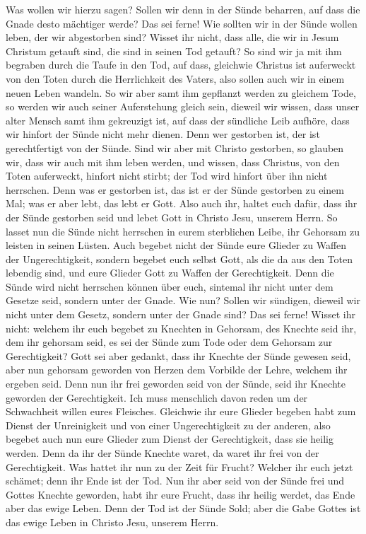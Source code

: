  Was wollen wir hierzu sagen? Sollen wir denn in der Sünde
beharren, auf dass die Gnade desto mächtiger werde?  Das
sei ferne! Wie sollten wir in der Sünde wollen leben, der wir
abgestorben sind?  Wisset ihr nicht, dass alle, die wir in
Jesum Christum getauft sind, die sind in seinen Tod getauft?
 So sind wir ja mit ihm begraben durch die Taufe in den
Tod, auf dass, gleichwie Christus ist auferweckt von den Toten durch die
Herrlichkeit des Vaters, also sollen auch wir in einem neuen Leben
wandeln.  So wir aber samt ihm gepflanzt werden zu
gleichem Tode, so werden wir auch seiner Auferstehung gleich sein,
 dieweil wir wissen, dass unser alter Mensch samt ihm
gekreuzigt ist, auf dass der sündliche Leib aufhöre, dass wir hinfort
der Sünde nicht mehr dienen.  Denn wer gestorben ist, der
ist gerechtfertigt von der Sünde.  Sind wir aber mit
Christo gestorben, so glauben wir, dass wir auch mit ihm leben werden,
 und wissen, dass Christus, von den Toten auferweckt,
hinfort nicht stirbt; der Tod wird hinfort über ihn nicht herrschen.
 Denn was er gestorben ist, das ist er der Sünde
gestorben zu einem Mal; was er aber lebt, das lebt er Gott.
 Also auch ihr, haltet euch dafür, dass ihr der Sünde
gestorben seid und lebet Gott in Christo Jesu, unserem Herrn.
 So lasset nun die Sünde nicht herrschen in eurem
sterblichen Leibe, ihr Gehorsam zu leisten in seinen Lüsten.
 Auch begebet nicht der Sünde eure Glieder zu Waffen der
Ungerechtigkeit, sondern begebet euch selbst Gott, als die da aus den
Toten lebendig sind, und eure Glieder Gott zu Waffen der Gerechtigkeit.
 Denn die Sünde wird nicht herrschen können über euch,
sintemal ihr nicht unter dem Gesetze seid, sondern unter der Gnade.
 Wie nun? Sollen wir sündigen, dieweil wir nicht unter
dem Gesetz, sondern unter der Gnade sind? Das sei ferne! 
Wisset ihr nicht: welchem ihr euch begebet zu Knechten in Gehorsam, des
Knechte seid ihr, dem ihr gehorsam seid, es sei der Sünde zum Tode oder
dem Gehorsam zur Gerechtigkeit?  Gott sei aber gedankt,
dass ihr Knechte der Sünde gewesen seid, aber nun gehorsam geworden von
Herzen dem Vorbilde der Lehre, welchem ihr ergeben seid. 
Denn nun ihr frei geworden seid von der Sünde, seid ihr Knechte geworden
der Gerechtigkeit.  Ich muss menschlich davon reden um
der Schwachheit willen eures Fleisches. Gleichwie ihr eure Glieder
begeben habt zum Dienst der Unreinigkeit und von einer Ungerechtigkeit
zu der anderen, also begebet auch nun eure Glieder zum Dienst der
Gerechtigkeit, dass sie heilig werden.  Denn da ihr der
Sünde Knechte waret, da waret ihr frei von der Gerechtigkeit.
 Was hattet ihr nun zu der Zeit für Frucht? Welcher ihr
euch jetzt schämet; denn ihr Ende ist der Tod.  Nun ihr
aber seid von der Sünde frei und Gottes Knechte geworden, habt ihr eure
Frucht, dass ihr heilig werdet, das Ende aber das ewige Leben.
 Denn der Tod ist der Sünde Sold; aber die Gabe Gottes
ist das ewige Leben in Christo Jesu, unserem Herrn.

